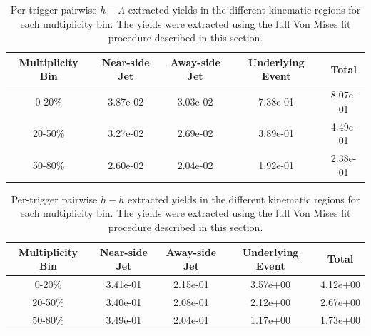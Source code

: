 \documentclass[ALICE,manyauthors]{ALICE_analysis_notes}
\begin{document}
\begin{table}[h!]
\centering
\begin{tabular}{| c || c | c | c | c | }
\hline
Multiplicity Bin & Near-side Jet & Away-side Jet & Underlying Event & Total  \\
\hline
	
0-20\% & 3.87e-02  & 3.03e-02  & 7.38e-01 & 8.07e-01 \\
20-50\% & 3.27e-02 & 2.69e-02  & 3.89e-01 & 4.49e-01 \\
50-80\% & 2.60e-02 & 2.04e-02  & 1.92e-01 & 2.38e-01 \\
	
\hline
\end{tabular}
\caption{Per-trigger pairwise $h-\Lambda$ extracted yields in the different kinematic regions for each multiplicity bin. The yields were extracted using the full Von Mises fit procedure described in this section.}
\label{h_lambda_yield_table_vonfit}
\end{table}
	
\begin{table}[h!]
\centering
\begin{tabular}{| c || c | c | c | c | }
\hline
Multiplicity Bin & Near-side Jet & Away-side Jet & Underlying Event & Total  \\
\hline

0-20\% & 3.41e-01  & 2.15e-01  & 3.57e+00 & 4.12e+00 \\
20-50\% & 3.40e-01 & 2.08e-01  & 2.12e+00 & 2.67e+00 \\
50-80\% & 3.49e-01 & 2.04e-01  & 1.17e+00 & 1.73e+00 \\

\hline
\end{tabular}
\caption{Per-trigger pairwise $h-h$ extracted yields in the different kinematic regions for each multiplicity bin. The yields were extracted using the full Von Mises fit procedure described in this section.}
\label{h_h_yield_table_vonfit}
\end{table}

\clearpage
\end{document}
